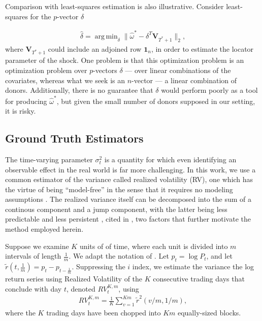 \documentclass[11pt,3p,review,authoryear]{elsarticle}
\DeclareMathOperator*{\argmin}{arg\,min} %
\theoremstyle{definition}
\begin{document}
\vspace*{12pt} Comparison with least-squares estimation is also illustrative.  Consider least-squares for the $p$-vector $\delta$

\begin{align*}
 \hat\delta=\argmin_{\delta}\|\hat{\omega}^{*} - \delta^{T}\textbf{V}_{T^{*}+1}\|_{2},
\end{align*}
where $\textbf{V}_{T^{*}+1}$ could include an adjoined row $\textbf{1}_{n}$, in order to estimate the locator parameter of the shock.  One problem is that this optimization problem is an optimization problem over $p$-vectors $\delta$ --- over linear combinations of the covariates, whereas what we seek is an $n$-vector --- a linear combination of donors.  Additionally, there is no guarantee that $\delta$ would perform poorly as a tool for producing $\hat\omega^{*}$, but given the small number of donors supposed in our setting, it is risky.

\subsection{Ground Truth Estimators}
    \label{Ground Truth Estimators}
    
    The time-varying parameter $\sigma^{2}_{t}$ is a quantity for which even identifying an observable effect in the real world is far more challenging.  In this work, we use a common estimator of the variance called realized volatility (RV), one which has the virtue of being ``model-free'' in the sense that it requires no modeling assumptions \citep{andersen2010stochastic}.  The realized variance itself can be decomposed into the sum of a continous component and a jump component, with the latter being less predictable and less persistent \citep{andersen2007roughing}, cited in \citet{de2006forecasting}, two factors that further motivate the method employed herein.
    
    Suppose we examine $K$ units of of time, where each unit is divided into $m$ intervals of length $\frac{1}{m}$.  We adapt the notation of \citet{andersen2008realized}. Let $p_{t} = \log{P_{t}}$, and let $\tilde{r}(t,\frac{1}{m}) = p_{t} - p_{t-\frac{1}{m}}$.  Suppressing the $i$ index, we estimate the variance the log return series using Realized Volatility of the $K$ consecutive trading days that conclude with day $t$, denoted $RV_{t}^{K,m}$, using    
   \begin{align*}
    RV_{t}^{K,m} = \frac{1}{K}\sum^{Km}_{v=1}\tilde{r}^{2}(v/m,1/m),
   \end{align*}
    where the $K$ trading days have been chopped into $Km$ equally-sized blocks.
\end{document}
